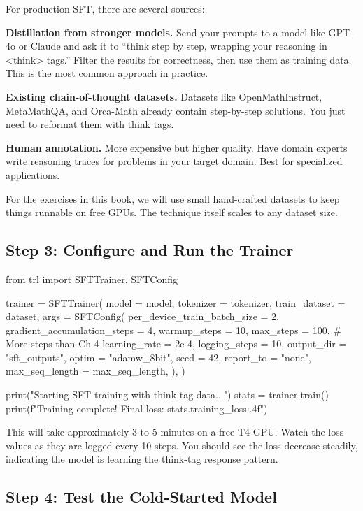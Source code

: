 \begin{chapterenv}
\begin{infobox}
For production SFT, there are several sources:

\textbf{Distillation from stronger models.} Send your prompts to a model like GPT-4o or Claude and ask it to ``think step by step, wrapping your reasoning in <think> tags.'' Filter the results for correctness, then use them as training data. This is the most common approach in practice.

\textbf{Existing chain-of-thought datasets.} Datasets like OpenMathInstruct, MetaMathQA, and Orca-Math already contain step-by-step solutions. You just need to reformat them with think tags.

\textbf{Human annotation.} More expensive but higher quality. Have domain experts write reasoning traces for problems in your target domain. Best for specialized applications.

For the exercises in this book, we will use small hand-crafted datasets to keep things runnable on free GPUs. The technique itself scales to any dataset size.
\end{infobox}

\subsection{Step 3: Configure and Run the Trainer}

\begin{codeblock}[python]
from trl import SFTTrainer, SFTConfig

trainer = SFTTrainer(
    model = model,
    tokenizer = tokenizer,
    train_dataset = dataset,
    args = SFTConfig(
        per_device_train_batch_size = 2,
        gradient_accumulation_steps = 4,
        warmup_steps = 10,
        max_steps = 100,           # More steps than Ch 4
        learning_rate = 2e-4,
        logging_steps = 10,
        output_dir = "sft_outputs",
        optim = "adamw_8bit",
        seed = 42,
        report_to = "none",
        max_seq_length = max_seq_length,
    ),
)

print("Starting SFT training with think-tag data...")
stats = trainer.train()
print(f"Training complete! Final loss: {stats.training_loss:.4f}")
\end{codeblock}

This will take approximately 3 to 5 minutes on a free T4 GPU. Watch the loss values as they are logged every 10 steps. You should see the loss decrease steadily, indicating the model is learning the think-tag response pattern.

\subsection{Step 4: Test the Cold-Started Model}


\end{chapterenv}
